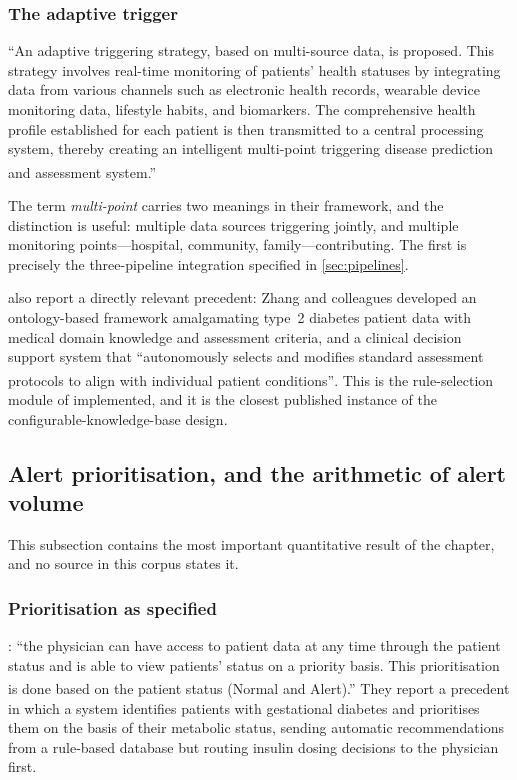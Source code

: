 \documentclass[12pt,a4paper,oneside]{report}
\newcommand{\bq}[1]{``#1''\textsuperscript{\dag}}
\begin{document}
\subsubsection{The adaptive trigger}

\bq{An adaptive triggering strategy, based on multi-source data, is proposed. This strategy involves real-time monitoring of patients' health statuses by integrating data from various channels such as electronic health records, wearable device monitoring data, lifestyle habits, and biomarkers. The comprehensive health profile established for each patient is then transmitted to a central processing system, thereby creating an intelligent multi-point triggering disease prediction and assessment system.}

The term \emph{multi-point} carries two meanings in their framework, and the distinction is useful: multiple data sources triggering jointly, and multiple monitoring points---hospital, community, family---contributing. The first is precisely the three-pipeline integration specified in \cref{sec:pipelines}.

\Textcite{liu2025review} also report a directly relevant precedent: Zhang and colleagues developed an ontology-based framework amalgamating type~2 diabetes patient data with medical domain knowledge and assessment criteria, and a clinical decision support system that \bq{autonomously selects and modifies standard assessment protocols to align with individual patient conditions}. This is the rule-selection module of \textcite{yazdani2018} implemented, and it is the closest published instance of the configurable-knowledge-base design.

\subsection{Alert prioritisation, and the arithmetic of alert volume}\label{sec:alert-volume}

This subsection contains the most important quantitative result of the chapter, and no source in this corpus states it.

\subsubsection{Prioritisation as specified}

\Textcite{yazdani2018}: \bq{the physician can have access to patient data at any time through the patient status and is able to view patients' status on a priority basis. This prioritisation is done based on the patient status (Normal and Alert).} They report a precedent in which a system identifies patients with gestational diabetes and prioritises them on the basis of their metabolic status, sending automatic recommendations from a rule-based database but routing insulin dosing decisions to the physician first.
\end{document}
